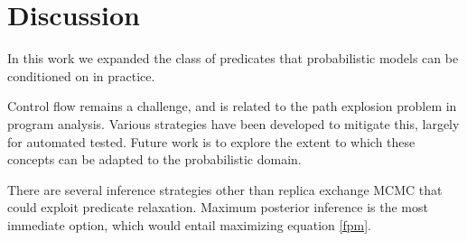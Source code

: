 \section{Discussion}
In this work we expanded the class of predicates that probabilistic models can be conditioned on in practice.

Control flow remains a challenge, and is related to the path explosion problem in program analysis.
Various strategies have been developed \cite{cadar2008exe, sen2005cute} to mitigate this, largely for automated tested.
Future work is to explore the extent to which these concepts can be adapted to the probabilistic domain.

There are several inference strategies other than replica exchange MCMC that could exploit predicate relaxation.
Maximum posterior inference is the most immediate option, which would entail maximizing equation \ref{fpm}.



